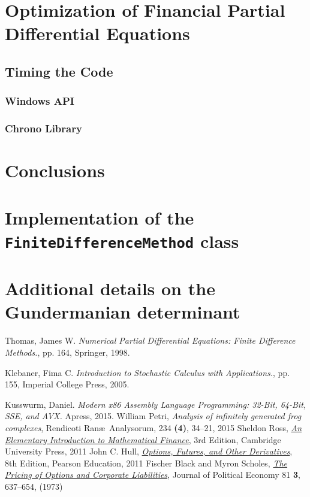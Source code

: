 \documentclass[12pt, oneside]{book}
\theoremstyle{plain}
\theoremstyle{definition}
\begin{document}
\chapter{Optimization of Financial Partial Differential Equations}

\section{Timing the Code}
\subsection{Windows API}

\subsection{Chrono Library}



\chapter{Conclusions}


\appendix
\chapter{Implementation of the {\tt FiniteDifferenceMethod} class}
\lipsum[100]
\chapter[shorter running title]{Additional details on the Gundermanian determinant}
\lipsum[100]




\begin{thebibliography}{12}
 Thomas, James W. {\it Numerical Partial Differential Equations: Finite Difference Methods.}, pp. 164, Springer, 1998.

Klebaner, Fima C. {\it Introduction to Stochastic Calculus with Applications.}, pp. 155, Imperial College Press, 2005.

Kusswurm, Daniel. {\it Modern x86 Assembly Language Programming: 32-Bit, 64-Bit, SSE, and AVX.} Apress, 2015.
   William Petri, 
  {\it Analysis of infinitely generated frog complexes},
	Rendicoti Ran\ae \ Analysorum, 234 {\bf (4)}, 34--21, 2015
  Sheldon Ross, {\it 
  \href{https://www-dawsonera-com.ezproxy.library.qmul.ac.uk/abstract/9781139069694}{An Elementary Introduction to Mathematical Finance}},
	3rd Edition, Cambridge University Press, 2011
	John C. Hull, 
	{\it \href{https://www-dawsonera-com.ezproxy.library.qmul.ac.uk/abstract/9781447930419}{Options, Futures, and Other Derivatives}},
	8th Edition, Pearson Education, 2011
	Fischer Black and  Myron Scholes,
	{\it \href{https://www.cs.princeton.edu/courses/archive/fall09/cos323/papers/black_scholes73.pdf}
	{The Pricing of Options and Corporate Liabilities}},
	Journal of Political Economy 81 {\bf 3}, 637--654,  (1973)
	
\end{thebibliography}
\end{document}
